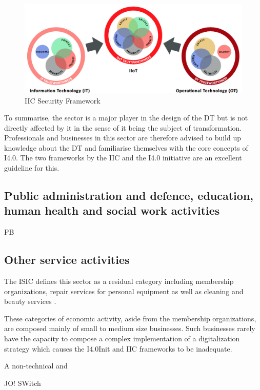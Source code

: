\begin{figure}[H]
\centering
\includegraphics[width=1\columnwidth]{images/iic-iiot-trustworthiness}
\caption{\ac{IIC} Security Framework}
\end{figure}

To summarise, the sector is a major player in the design of the \ac{DT} but is not directly affected by it in the sense of it being the subject of transformation. Professionals and businesses in this sector are therefore advised to build up knowledge about the \ac{DT} and familiarise themselves with the core concepts of \ac{I4.0}. The two frameworks by the \ac{IIC} and the \ac{I4.0} initiative are an excellent guideline for this.

\subsection{Public administration and defence, education, human health and social work activities}
PB

\subsection{Other service activities}
The \ac{ISIC} defines this sector as a residual category including membership organizations, repair services for personal equipment as well as cleaning and beauty services \cite[p.262ff.]{ISIC:2008}.

These categories of economic activity, aside from the membership organizations, are composed mainly of small to medium size businesses. Such businesses rarely have the capacity to compose a complex implementation of a digitalization strategy which causes the \ac{I4.0Init} and \ac{IIC} frameworks to be inadequate.

A non-technical and

JO! SWitch
